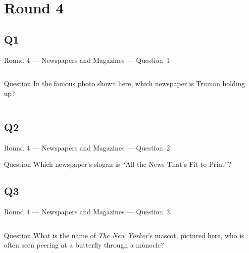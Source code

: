 \documentclass[11pt]{beamer}
\begin{document}
\section{Round 4}
\subsection*{Q1}
\begin{frame}[t]{Round 4 --- Newspapers and Magazines --- \mbox{Question 1}}
    \vspace{-0.5em}
    \begin{columns}[T,totalwidth=\linewidth]
        \begin{column}{0.32\linewidth}
            \begin{block}{Question}
                In the famous photo shown here, which newspaper is Truman holding up?
            \end{block}
        \end{column}
        \begin{column}{0.65\linewidth}
            \begin{center}
                \texttt{[image: \{Images/DeweyTruman]}.jpg}
            \end{center}
        \end{column}
    \end{columns}
\end{frame}
\subsection*{Q2}
\begin{frame}[t]{Round 4 --- Newspapers and Magazines --- \mbox{Question 2}}
    \vspace{-0.5em}
    \begin{block}{Question}
        Which newspaper's slogan is ``All the News That's Fit to Print''?
    \end{block}
\end{frame}
\subsection*{Q3}
\begin{frame}[t]{Round 4 --- Newspapers and Magazines --- \mbox{Question 3}}
    \vspace{-0.5em}
    \begin{columns}[T,totalwidth=\linewidth]
        \begin{column}{0.32\linewidth}
            \begin{block}{Question}
                What is the name of \emph{The New Yorker}'s mascot, pictured here, who is often seen peering at a butterfly through a monocle?
            \end{block}
        \end{column}
        \begin{column}{0.65\linewidth}
            \begin{center}
                \texttt{[image: \{Images/eusticetilley]}.jpg}
            \end{center}
        \end{column}
    \end{columns}
\end{frame}
\end{document}

